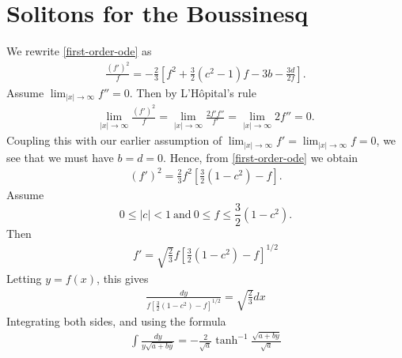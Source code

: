 \documentclass[12pt,reqno]{amsart}
\numberwithin{equation}{section}  %
\begin{document}
\section{Solitons for the Boussinesq} 
\label{sec:soliton}
We rewrite \eqref{first-order-ode} as
%
%
\begin{equation}
  \label{first-order-rewritten}
\begin{split}
  \frac{(f')^{2}}{f} = -\frac{2}{3}\left[ f^{2} + \frac{3}{2}(c^{2}-1)f - 3b -
  \frac{3d}{2f}\right].
\end{split}
\end{equation}
%
%
Assume $\lim_{|x| \to \infty} f'' =0$. Then by L'H\^opital's rule
%
%
\begin{equation*}
\begin{split}
  \lim_{|x| \to \infty} \frac{(f')^{2}}{f} = \lim_{|x| \to \infty} \frac{2f'
  f''}{f'} = \lim_{|x| \to \infty} 2f'' = 0.
\end{split}
\end{equation*}
%
%
Coupling this with our earlier assumption of $\lim_{| x | \to \infty} f' = \lim_{| x
| \to \infty} f = 0$, we see that we must have $b =d=0$. Hence, from 
\eqref{first-order-ode} we obtain 
%
%
\begin{equation}
  \label{bous-ode-simp}
\begin{split}
  (f')^{2} = \frac{2}{3} f^{2} \left [ \frac{3}{2} (1-c^{2}) -f \right ]. 
\end{split}
\end{equation}
%
%
Assume $$0 \le |c| < 1 \ \text{and} \ 0 \le f \le \frac{3}{2}(1-c^{2}).$$ 
%
%
Then
%
%
\begin{equation*}
\begin{split}
  f' = \sqrt{\frac{2}{3}}f \left[ \frac{3}{2}(1 - c^{2}) -f \right]^{1/2}
\end{split}
\end{equation*}
%
%
Letting $y = f(x)$, this gives
%
%
\begin{equation*}
\begin{split}
\frac{dy}{ f \left[ \frac{3}{2}(1 - c^{2}) -f \right]^{1/2}} = \sqrt{\frac{2}{3}}
dx
\end{split}
\end{equation*}
%
%
Integrating both sides, and using the formula
%
%
\begin{equation*}
\begin{split}
  \int \frac{dy}{y \sqrt{a + by}} = -\frac{2}{ \sqrt{a}} \tanh^{-1}
  \frac{\sqrt{a+ by}}{ \sqrt{a}}
\end{split}
\end{equation*}
\end{document}
